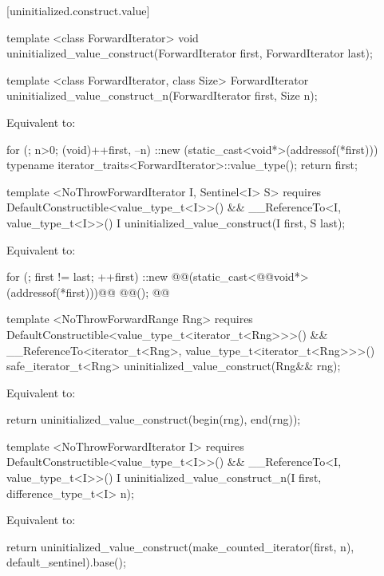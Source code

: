 [uninitialized.construct.value]{}
{\color{remclr}
\begin{codeblock}
template <class ForwardIterator>
  void uninitialized_value_construct(ForwardIterator first, ForwardIterator last);
\end{codeblock}

\begin{codeblock}
template <class ForwardIterator, class Size>
  ForwardIterator uninitialized_value_construct_n(ForwardIterator first, Size n);
\end{codeblock}
\setcounter{Paras}{1}
\pnum
\effects Equivalent to:
\begin{codeblock}
        for (; n>0; (void)++first, --n)
          ::new (static_cast<void*>(addressof(*first)))
            typename iterator_traits<ForwardIterator>::value_type();
        return first;
\end{codeblock}
} %

{\color{addclr}
\begin{codeblock}
template <NoThrowForwardIterator I, Sentinel<I> S>
  requires DefaultConstructible<value_type_t<I>>() &&
           __ReferenceTo<I, value_type_t<I>>()
    I uninitialized_value_construct(I first, S last);
\end{codeblock}

\setcounter{Paras}{0}
\pnum
\effects Equivalent to:
} %

\begin{codeblock}
        for (; first != last; ++first)
          ::new @@(static_cast<@@void*>(addressof(*first)))@\added{)}@
            @@();
        @@
\end{codeblock}

{\color{addclr}
\begin{codeblock}
template <NoThrowForwardRange Rng>
  requires DefaultConstructible<value_type_t<iterator_t<Rng>>>() &&
           __ReferenceTo<iterator_t<Rng>, value_type_t<iterator_t<Rng>>>()
    safe_iterator_t<Rng>
    uninitialized_value_construct(Rng&& rng);
\end{codeblock}

\pnum
\effects Equivalent to:
\begin{codeblock}
        return uninitialized_value_construct(begin(rng), end(rng));
\end{codeblock}

\begin{codeblock}
template <NoThrowForwardIterator I>
  requires DefaultConstructible<value_type_t<I>>() &&
           __ReferenceTo<I, value_type_t<I>>()
    I uninitialized_value_construct_n(I first, difference_type_t<I> n);
\end{codeblock}

\pnum
\effects Equivalent to:
\begin{codeblock}
        return uninitialized_value_construct(make_counted_iterator(first, n),
                                             default_sentinel{}).base();
\end{codeblock}
} %

